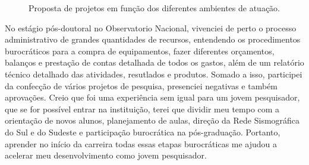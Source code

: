 \documentclass[10pt,a4paper,oneside]{book}
\begin{document}
\begin{figure}[ht]
	\centering
	\bigskip
	\caption{Proposta de projetos em função dos diferentes ambientes de atuação.}
	\label{fig_resumo_projetos}
\end{figure}

No estágio pós-doutoral no Observatorio Nacional, vivenciei de perto o processo administrativo de grandes quantidades de recursos, entendendo os procedimentos burocráticos para a compra de equipamentos, fazer diferentes orçamentos, balanços e prestação de contas detalhada de todos os gastos, além de um relatório técnico detalhado das atividades, resutlados e produtos. Somado a isso, participei da confecção de vários projetos de pesquisa, presenciei negativas e também aprovações. Creio que foi uma experiência sem igual para um jovem pesquisador, que se for possível entrar na instituição, terei que dividir meu tempo com a orientação de novos alunos, planejamento de aulas, direção da Rede Sismográfica do Sul e do Sudeste e participação burocrática na pós-graduação. Portanto, aprender no início da carreira todas essas etapas burocráticas me ajudou a acelerar meu desenvolvimento como jovem pesquisador.
\end{document}
